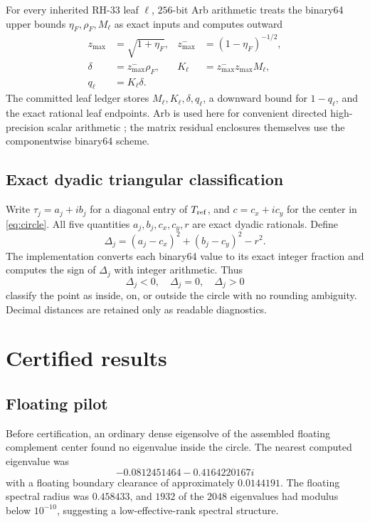 \documentclass[11pt]{article}
\theoremstyle{definition}
\theoremstyle{remark}
\newcommand{\Tref}{T_{\rm ref}}
\begin{document}
For every inherited RH-33 leaf \(\ell\), \(256\)-bit Arb arithmetic treats
the binary64 upper bounds \(\eta_F,\rho_F,M_\ell\) as exact inputs and
computes outward
\begin{align}
 z_{\max}&=\sqrt{1+\eta_F},
 &
 z_{\max}^{-}&=(1-\eta_F)^{-1/2},
 \label{eq:arb-z}\\
 \delta&=z_{\max}^{-}\rho_F,
 &
 K_\ell&=z_{\max}^{-}z_{\max}M_\ell,
 \label{eq:arb-transport}\\
 q_\ell&=K_\ell\delta.
 \label{eq:leaf-product}
\end{align}
The committed leaf ledger stores \(M_\ell,K_\ell,\delta,q_\ell\), a
downward bound for \(1-q_\ell\), and the exact rational leaf endpoints.
Arb is used here for convenient directed high-precision scalar arithmetic
\citep{Johansson2017}; the matrix residual enclosures themselves use the
componentwise binary64 scheme.

\subsection{Exact dyadic triangular classification}

Write \(\tau_j=a_j+ib_j\) for a diagonal entry of \(\Tref\), and
\(c=c_x+ic_y\) for the center in \cref{eq:circle}.  All five quantities
\(a_j,b_j,c_x,c_y,r\) are exact dyadic rationals.  Define
\begin{equation}
 \Delta_j=(a_j-c_x)^2+(b_j-c_y)^2-r^2.
 \label{eq:dyadic-margin}
\end{equation}
The implementation converts each binary64 value to its exact integer
fraction and computes the sign of \(\Delta_j\) with integer arithmetic.
Thus
\[
 \Delta_j<0,\quad \Delta_j=0,\quad \Delta_j>0
\]
classify the point as inside, on, or outside the circle with no rounding
ambiguity.  Decimal distances are retained only as readable diagnostics.

\section{Certified results}
\label{sec:results}

\subsection{Floating pilot}

Before certification, an ordinary dense eigensolve of the assembled
floating complement center found no eigenvalue inside the circle.  The
nearest computed eigenvalue was
\[
 -0.0812451464-0.4164220167i
\]
with a floating boundary clearance of approximately \(0.0144191\).
The floating spectral radius was \(0.458433\), and \(1932\) of the
\(2048\) eigenvalues had modulus below \(10^{-10}\), suggesting a
low-effective-rank spectral structure.
\end{document}
